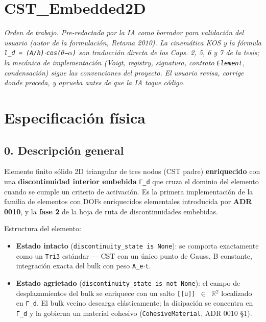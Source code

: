 \documentclass[11pt,letterpaper,oneside]{report}
\begin{document}
\section{CST\_Embedded2D}



\textit{Orden de trabajo. Pre-redactada por la IA como borrador para validación del usuario (autor de la formulación, Retama 2010). La cinemática KOS y la fórmula \texttt{l\_d = (A/h)\ensuremath{\cdot}cos(\ensuremath{\theta}−\ensuremath{\alpha})} son traducción directa de los Caps. 2, 5, 6 y 7 de la tesis; la mecánica de implementación (Voigt, registry, signatura, contrato \texttt{Element}, condensación) sigue las convenciones del proyecto. El usuario revisa, corrige donde proceda, y aprueba antes de que la IA toque código.}



\section{Especificación física}

\subsection{0. Descripción general}

Elemento finito sólido 2D triangular de tres nodos (CST padre) \textbf{enriquecido} con una \textbf{discontinuidad interior embebida} \texttt{Γ\_d} que cruza el dominio del elemento cuando se cumple un criterio de activación. Es la primera implementación de la familia de elementos con DOFs enriquecidos elementales introducida por \textbf{ADR 0010}, y la \textbf{fase 2} de la hoja de ruta de discontinuidades embebidas.

Estructura del elemento:

\begin{itemize}
  \item \textbf{Estado intacto} (\texttt{discontinuity\_state is None}): se comporta exactamente como un \texttt{Tri3} estándar --- CST con un único punto de Gauss, B constante, integración exacta del bulk con peso \texttt{A\_e\ensuremath{\cdot}t}.
  \item \textbf{Estado agrietado} (\texttt{discontinuity\_state is not None}): el campo de desplazamientos del bulk se enriquece con un salto \texttt{[[u]] \ensuremath{\in} \ensuremath{\mathbb{R}}\ensuremath{^{2}}} localizado en \texttt{Γ\_d}. El bulk vecino descarga elásticamente; la disipación se concentra en \texttt{Γ\_d} y la gobierna un material cohesivo (\texttt{CohesiveMaterial}, ADR 0010 §1).
\end{itemize}
\end{document}
